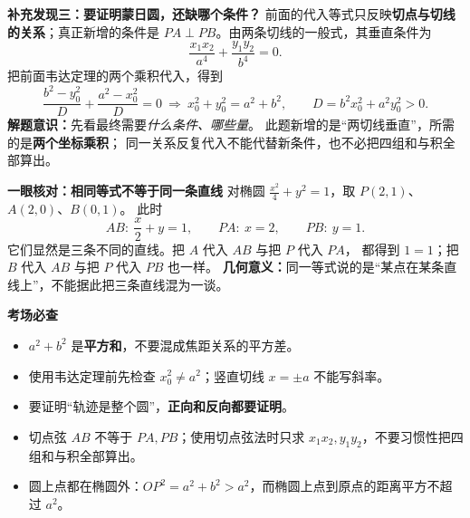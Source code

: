 \begin{summarybox}
  \medskip
  \textbf{\textcolor{CSummary}{补充发现三：要证明蒙日圆，还缺哪个条件？}}
  前面的代入等式只反映\textbf{切点与切线的关系}；真正新增的条件是
  $PA\perp PB$。由两条切线的一般式，其垂直条件为
  \[
    \boxed{\frac{x_1x_2}{a^4}+\frac{y_1y_2}{b^4}=0}.
  \]
  把前面韦达定理的两个乘积代入，得到
  \[
    \frac{b^2-y_0^2}{D}+\frac{a^2-x_0^2}{D}=0
    \ \Longrightarrow\ 
    \boxed{x_0^2+y_0^2=a^2+b^2},
    \qquad D=b^2x_0^2+a^2y_0^2>0.
  \]
  \textbf{解题意识：}先看最终需要\emph{什么条件、哪些量}。
  此题新增的是“两切线垂直”，所需的是\textbf{两个坐标乘积}；
  同一关系反复代入不能代替新条件，也不必把四组和与积全部算出。

  \medskip
  \textbf{\textcolor{CSummary}{一眼核对：相同等式不等于同一条直线}}
  对椭圆 $\frac{x^2}{4}+y^2=1$，取 $P(2,1)$、$A(2,0)$、$B(0,1)$。
  此时
  \[
    AB:\ \frac{x}{2}+y=1,\qquad
    PA:\ x=2,\qquad PB:\ y=1.
  \]
  它们显然是三条不同的直线。把 $A$ 代入 $AB$ 与把 $P$ 代入 $PA$，
  都得到 $1=1$；把 $B$ 代入 $AB$ 与把 $P$ 代入 $PB$ 也一样。
  \textbf{几何意义：}同一等式说的是“某点在某条直线上”，不能据此把三条直线混为一谈。

  \textbf{\textcolor{CSummary}{考场必查}}
  \begin{itemize}[leftmargin=*, itemsep=0.25em]
    \item $a^2+b^2$ 是\textbf{平方和}，不要混成焦距关系的平方差。
    \item 使用韦达定理前先检查 $x_0^2\ne a^2$；竖直切线 $x=\pm a$ 不能写斜率。
    \item 要证明“轨迹是整个圆”，\textbf{正向和反向都要证明}。
    \item 切点弦 $AB$ 不等于 $PA,PB$；使用切点弦法时只求 $x_1x_2,y_1y_2$，不要习惯性把四组和与积全部算出。
    \item 圆上点都在椭圆外：$OP^2=a^2+b^2>a^2$，而椭圆上点到原点的距离平方不超过 $a^2$。
  \end{itemize}
\end{summarybox}
